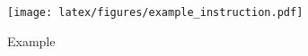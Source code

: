 
    




\begin{figure}[tbp] 
    \centering
    \texttt{[image: latex/figures/example\_instruction.pdf]} 
    \caption{Example }
\end{figure}